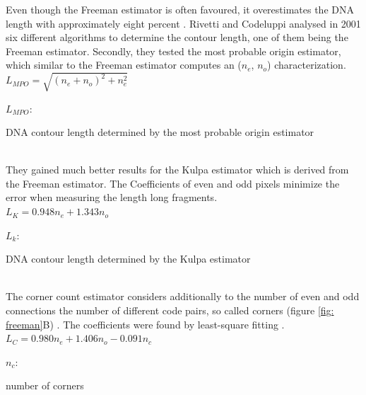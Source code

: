 \documentclass{article}
\begin{document}
Even though the Freeman estimator is often favoured, it overestimates the DNA length with approximately eight percent \cite{sanchez2002accuracy}. Rivetti and Codeluppi analysed in 2001 six different algorithms to determine the contour length, one of them being the Freeman estimator. 
Secondly, they tested the most probable origin estimator, which similar to the Freeman estimator computes an ($n_{e}$, $n_{o}$) characterization. \\

$ L_{MPO} = \sqrt{(n_{e} + n_{o})^{2} + n_{e}^{2}} $

\hspace{0,2cm}

$ L_{MPO} $: \begin{footnotesize}
DNA contour length determined by the most probable origin estimator
\end{footnotesize} \\

They gained much better results for the Kulpa estimator which is derived from the Freeman estimator. The Coefficients of even and odd pixels minimize the error when measuring the length long fragments.\\

$ L_{K} = 0.948n_{e} + 1.343 n_{o} $

\hspace{0,2cm}

$ L_{k} $: \begin{footnotesize}
DNA contour length determined by the Kulpa estimator
\end{footnotesize} \\

The corner count estimator considers additionally to the number of even and odd connections the number of different code pairs, so called corners (figure \ref{fig: freeman}B) \cite{vossepoel1982vector}. The coefficients were found by least-square fitting \cite{yang1994methods}.  \\


$ L_{C} = 0.980n_{e} + 1.406 n_{o} - 0.091 n_{c} $

\hspace{0,2cm}

$ n_{c} $: \begin{footnotesize}
number of corners
\end{footnotesize} \\
\end{document}
